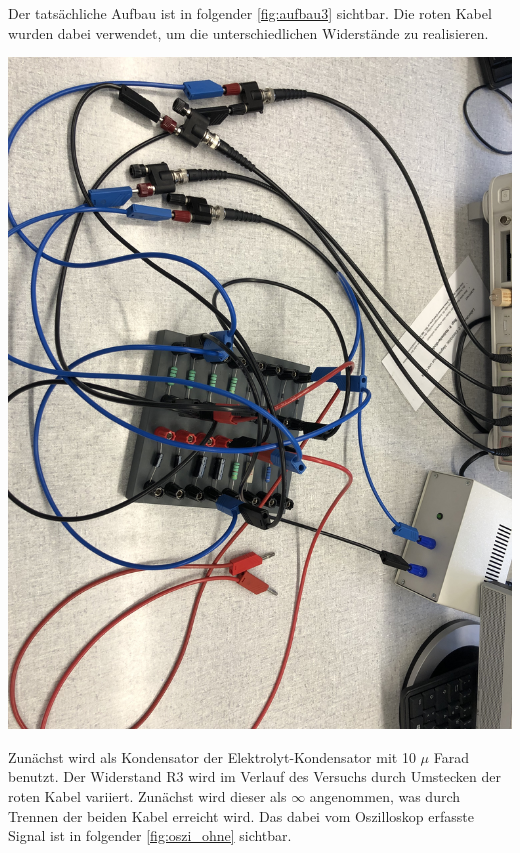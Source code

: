 \documentclass[11pt,ngerman]{scrartcl}
\begin{document}
\noindent Der tatsächliche Aufbau ist in folgender \autoref{fig:aufbau3} sichtbar. Die roten Kabel wurden dabei verwendet, um die unterschiedlichen Widerstände zu realisieren.

\begin{center}
	\begin{minipage}[t]{0.7\textwidth}
		\includegraphics[width=\textwidth]{aufbau3}
		\label{fig:aufbau3}
	\end{minipage}
\end{center}

Zunächst wird als Kondensator der Elektrolyt-Kondensator mit 10 $\mu$ Farad benutzt. Der Widerstand R3 wird im Verlauf des Versuchs durch Umstecken der roten Kabel variiert. Zunächst wird dieser als $\infty$ angenommen, was durch Trennen der beiden Kabel erreicht wird. Das dabei vom Oszilloskop erfasste Signal ist in folgender \autoref{fig:oszi_ohne} sichtbar.
\end{document}

